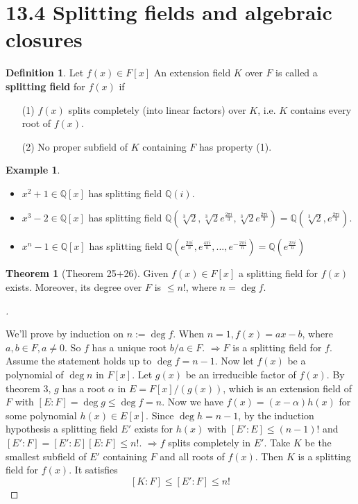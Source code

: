 \documentclass{article}
\theoremstyle{definition}
\newtheorem{thm}{Theorem}
\newtheorem{ex}{Example}
\newtheorem{dfn}{Definition}
\newenvironment{proofs}[1][\proofname]{%
  \begin{proof}[#1]$ $\par\nobreak\ignorespaces
}{%
  \end{proof}
}
\begin{document}
\section*{13.4  Splitting fields and algebraic closures}

\begin{dfn}
	Let $f(x) \in F[x]$ An extension field $K$ over $F$ is called a \textbf{splitting field} for $f(x)$ if 
	\begin{enumerate}
		\item[(1)] $f(x)$ splits completely (into linear factors) over $K$, i.e. $K$ contains every root of $f(x)$.

		\item[(2)] No proper subfield of $K$ containing $F$ has property (1).
	\end{enumerate}
\end{dfn}

\begin{ex}
	\begin{itemize}
		\item $x^2 + 1 \in \mathbb{Q}[x]$ has splitting field $\mathbb{Q}(i)$.
		
		\item $x^3 - 2 \in \mathbb{Q}[x]$ has splitting field $\mathbb{Q}(\sqrt[3]{2}, \sqrt[3]{2} e^{\frac{2 \pi i}{3}}, \sqrt[3]{2} e^{\frac{2 \pi i}{3}}) = \mathbb{Q}(\sqrt[3]{2}, e^{\frac{2 \pi i}{3}})$.

		\item $x^n - 1 \in \mathbb{Q}[x]$ has splitting field $\mathbb{Q}(e^{\frac{2 \pi i}{n}}, e^{\frac{4 \pi i}{n}}, ..., e^{-\frac{2 \pi i}{n}}) = \mathbb{Q}(e^{\frac{2 \pi i}{n}})$
	\end{itemize}

\end{ex}

\begin{thm}[Theorem 25+26]
	Given $f(x) \in F[x]$ a splitting field for $f(x)$ exists.
	Moreover, its degree over $F$ is $\leq n!$, where $n = \deg f$.
\end{thm}

\begin{proofs}
	We'll prove by induction on $n := \deg f$.
	When $n = 1, f(x) = ax - b$, where $a, b \in F, a \neq 0$.
	So $f$ has a unique root $b/a \in F$.
	$\Rightarrow F$ is a splitting field for $f$.
	Assume the statement holds up to $\deg f = n - 1$.
	Now let $f(x)$ be a polynomial of $\deg n$ in $F[x]$.
	Let $g(x)$ be an irreducible factor of $f(x)$.
	By theorem 3, $g$ has a root $\alpha$ in $E = F[x]/(g(x))$, which is an extension field of $F$ with $[E:F] = \deg g \leq \deg f = n$.
	Now we have $f(x) = (x - \alpha) h(x)$ for some polynomial $h(x) \in E[x]$.
	Since $\deg h = n - 1$, by the induction hypothesis a splitting field $E'$ exists for $h(x)$ with $[E':E] \leq (n - 1)!$ and $[E':F] = [E':E][E:F] \leq n!$.
	$\Rightarrow f$ splits completely in $E'$.
	Take $K$ be the smallest subfield of $E'$ containing $F$ and all roots of $f(x)$. 
	Then $K$ is a splitting field for $f(x)$.
	It satisfies
	\[
		[K:F] \leq [E':F] \leq n!
	\]

\end{proofs}
\end{document}

